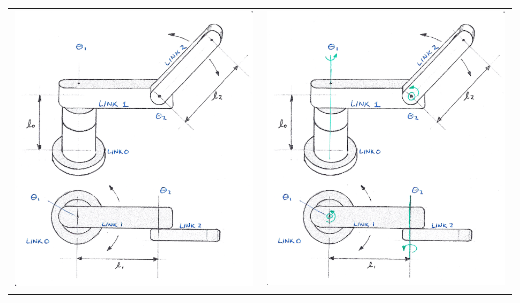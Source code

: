 \begin{Example}
\begin{tabular}{cc}
\includegraphics[width=3.25in]{figs03/00715_B.eps}
&
\includegraphics[width=3.25in]{figs03/00715_C.eps}
\end{tabular}
\end{Example}

